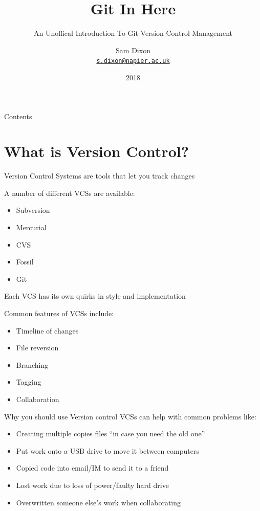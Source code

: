 \documentclass{beamer}
\title{Git In Here}
\subtitle{An Unoffical Introduction To Git Version Control Management}
\author{Sam Dixon\\
{\tt \href{mailto:s.dixon@napier.ac.uk}{s.dixon@napier.ac.uk}}}
\date{2018}
\begin{document}
\frame{\titlepage}

\begin{frame}{Contents}
    \tableofcontents
\end{frame}

\section{What is Version Control?}
\begin{frame}[allowframebreaks]{\secname}
    Version Control Systems are tools that let you track changes

    A number of different VCSs are available:
    \begin{itemize}
        \item Subversion
        \item Mercurial
        \item CVS
        \item Fossil
        \item Git
    \end{itemize}
    Each VCS has its own quirks in style and implementation

\framebreak
    
    Common features of VCSs include:
    \begin{itemize}
        \item Timeline of changes
        \item File reversion  
        \item Branching
        \item Tagging
        \item Collaboration
    \end{itemize}
\end{frame}


\begin{frame}{Why you should use Version control}
    VCSs can help with common problems like:
    \begin{itemize}
        \item Creating multiple copies files ``in case you need the old one''
        \item Put work onto a USB drive to move it between computers
        \item Copied code into email/IM to send it to a friend
        \item Lost work due to loss of power/faulty hard drive
        \item Overwritten someone else's work when collaborating
    \end{itemize}
\end{frame}
\end{document}
